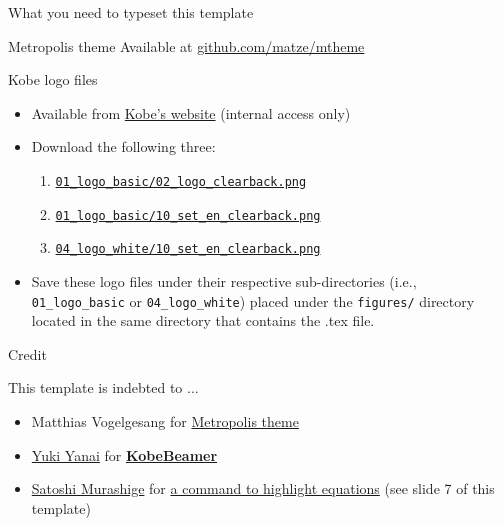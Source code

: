 \documentclass[12pt]{beamer}
\begin{document}
\begin{frame}{What you need to typeset this template}

\begin{block}{Metropolis theme}
Available at {\footnotesize \href{https://github.com/matze/mtheme}{github.com/matze/mtheme}}	
\end{block}

\begin{block}{Kobe logo files}
\begin{itemize}
\item Available from \href{https://www.kobe-u.ac.jp/info/outline/resources/download.html}{Kobe's website} (internal access only)	
\item Download the following three: 
	\begin{enumerate}
	\item \href{http://www.office.kobe-u.ac.jp/ppr-contents/logo/01_logo_basic/02_logo_clearback.png}{\footnotesize {\tt 01\_logo\_basic/02\_logo\_clearback.png}}
	\item \href{http://www.office.kobe-u.ac.jp/ppr-contents/logo/01_logo_basic/10_set_en_clearback.png}{\footnotesize {\tt 01\_logo\_basic/10\_set\_en\_clearback.png}}
	\item \href{http://www.office.kobe-u.ac.jp/ppr-contents/logo/04_logo_white/10_set_en_clearback.png}{\footnotesize {\tt 04\_logo\_white/10\_set\_en\_clearback.png}}
	\end{enumerate}
\item Save these logo files under their respective sub-directories (i.e., {\footnotesize \tt 01\_logo\_basic} or {\footnotesize\tt 04\_logo\_white}) placed under the {\tt \footnotesize figures/} directory located in the same directory that contains the .tex file.
\end{itemize}
\end{block}

\end{frame}


\begin{frame}{Credit}

This template is indebted to ...
\begin{itemize}
    \item Matthias Vogelgesang for \href{https://github.com/matze/mtheme}{Metropolis theme}
    \item \href{http://yukiyanai.github.io/}{Yuki Yanai} for \href{https://github.com/yukiyanai/KobeBeamer}{\textbf{\alert{KobeBeamer}}}
    \item \href{https://www.eqseqs.work/}{Satoshi Murashige} for \href{https://eqseqs.hatenablog.com/entry/2019/10/11/092852}{a command to highlight equations} (see slide 7 of this template)
\end{itemize}
\end{frame}
\end{document}
